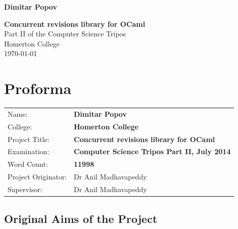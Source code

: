 \documentclass[12pt,twoside,notitlepage]{report}
\begin{document}





\pagestyle{empty}

\hfill{\LARGE \bf Dimitar Popov}

\vspace*{60mm}
\begin{center}
\Huge
{\bf Concurrent revisions library for OCaml} \\
\vspace*{5mm}
Part II of the Computer
Science Tripos\\
\vspace*{5mm}
Homerton College \\
\vspace*{5mm}
\today  %
\end{center}

\cleardoublepage


\setcounter{page}{1}
\pagestyle{plain}

\chapter*{Proforma}

{\large
\begin{tabular}{ll} 
Name:               & \bf Dimitar Popov                     \\
College:            & \bf Homerton College                     \\
Project Title:      & \bf Concurrent revisions library for OCaml \\
Examination:        & \bf Computer Science Tripos Part II, July 2014        \\
Word Count:         & \bf 11998\footnotemark[1]
\\
Project Originator: & Dr Anil Madhavapeddy                    \\
Supervisor:         & Dr Anil Madhavapeddy                    \\ 
\end{tabular}
}


\section*{Original Aims of the Project}
\end{document}

